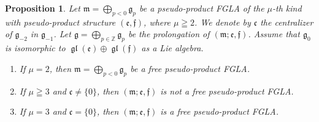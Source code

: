 \documentclass[11pt]{article}
\newtheorem{proposition}{Proposition}
\numberwithin{equation}{section}
\numberwithin{theorem}{section}
\numberwithin{proposition}{section}
\numberwithin{lemma}{section}
\numberwithin{corollary}{section}
\numberwithin{definition}{section}
\numberwithin{example}{section}
\numberwithin{remark}{section}
\numberwithin{note}{section}
\newcommand{\gl}{\operatorname{\mathfrak{gl}}}
\newcommand{\gla}[1]{\mathfrak#1=\bigoplus\limits_{p\in\mathbb Z}\mathfrak#1_p} \renewcommand{\labelenumi}{{\rm (\arabic{enumi})}}
\begin{document}
\begin{proposition}\label{prop8.4}
Let $\mathfrak m=\bigoplus\limits_{p<0}\mathfrak g_p$ be a
pseudo-product FGLA of the $\mu$-th kind with
pseudo-product structure $(\mathfrak e,\mathfrak f)$, where $\mu\geqq2$.
We denote by $\mathfrak c$
the centralizer of $\mathfrak g_{-2}$ in $\mathfrak g_{-1}$.
Let $\gla g$ be the prolongation of $(\mathfrak m;\mathfrak e,\mathfrak f)$.
Assume that $\mathfrak g_0$ is isomorphic to $\gl(\mathfrak e)\oplus\gl(\mathfrak f)$ as a Lie algebra.
\begin{enumerate}\itemsep=0pt
\item If $\mu=2$, then $\mathfrak m=\bigoplus\limits_{p<0}\mathfrak g_p$
be a free
pseudo-product FGLA.
\item If $\mu\geqq3$ and $\mathfrak c\ne\{0\}$,
then $(\mathfrak m;\mathfrak e,\mathfrak f)$ is not a free pseudo-product
FGLA.
\item If $\mu=3$ and $\mathfrak c=\{0\}$,
then $(\mathfrak m;\mathfrak e,\mathfrak f)$ is a free pseudo-product
FGLA.
\end{enumerate}
\end{proposition}
\end{document}
